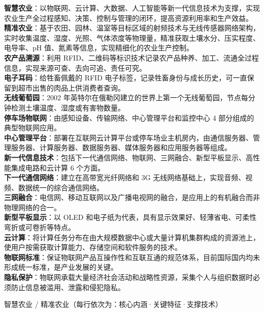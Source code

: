 \documentclass[a4paper,11pt]{article}
\begin{document}
\begin{keyterms}
\textbf{智慧农业}：以物联网、云计算、大数据、人工智能等新一代信息技术为支撑，实现农业生产全过程感知、决策、控制与管理的闭环，提高资源利用率和生产效益。\\
\textbf{精准农业}：基于农田、园林、温室等目标区域的射频技术与无线传感器网络架构，实时收集温度、湿度、光照、气体浓度等物理量，精准获取土壤水分、压实程度、电导率、pH 值、氮素等信息，实现精细化的农业生产控制。\\
\textbf{农产品溯源}：利用 RFID、二维码等标识技术记录农产品种养、加工、流通全过程信息，实现来源可查、去向可追、责任可究。\\
\textbf{电子耳码}：给牲畜佩戴的 RFID 电子标签，记录牲畜身份与成长历史，可一直保留到超市出售的肉品上供消费者查询。\\
\textbf{无线葡萄园}：2002 年英特尔在俄勒冈建立的世界上第一个无线葡萄园，节点每分钟检测土壤温度、湿度或有害物数量。\\
\textbf{停车场物联网}：由感知设备、传输网络、中心管理平台和监控中心 4 部分组成的典型物联网应用。\\
\textbf{中心管理平台}：部署在互联网云计算平台或停车场业主机房内，由通信服务器、管理服务器、计算服务器、数据服务器、媒体服务器和应用服务器等组成。\\
\textbf{新一代信息技术}：包括下一代通信网络、物联网、三网融合、新型平板显示、高性能集成电路和云计算 6 个方面。\\
\textbf{下一代通信网络}：建立在高带宽光纤网络和 3G 无线网络基础上，实现音频、视频、数据统一的综合通信网络。\\
\textbf{三网融合}：电信网、移动互联网以及广播电视网的融合，是应用上的有机融合而非物理网络的合一。\\
\textbf{新型平板显示}：以 OLED 和电子纸为代表，具有显示效果好、轻薄省电、可柔性弯折或可卷折等特点。\\
\textbf{云计算}：将计算任务分布在由大规模数据中心或大量计算机集群构成的资源池上，使用户按需获取计算能力、存储空间和软件服务的技术。\\
\textbf{物联网标准}：保证物联网产品互操作性和互联互通的规范体系，目前国际国内均未形成统一标准，是产业发展的关键。\\
\textbf{隐私保护}：物联网承载大量经济社会活动和战略性资源，采集个人与组织数据时必须防止信息被滥用、泄露和侵犯隐私。
\end{keyterms}

\needspace{6cm}
\begin{contrast}{智慧农业 / 精准农业（每行依次为：核心内涵·关键特征·支撑技术）}
\end{contrast}
\end{document}
